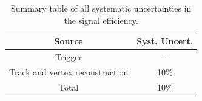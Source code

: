 \begin{table}[!htb]
	\centering
	\begin{tabular}{cc}
		\hline
		\hline
		Source                              &       Syst. Uncert.       \\
		\hline
        Trigger                             &       -                   \\
        Track and vertex reconstruction     &       10\%                \\
		\hline
        Total                               &       10\%                \\
		\hline
		\hline
	\end{tabular}
	\caption{Summary table of all systematic uncertainties in the signal efficiency.}
	\label{tab:syst_total}
\end{table}


























